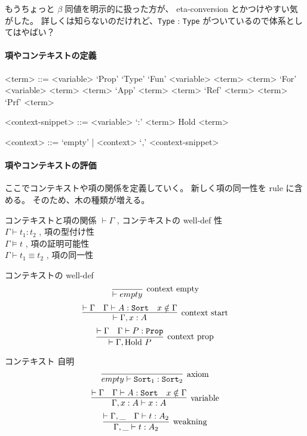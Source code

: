 もうちょっと \(\beta\) 同値を明示的に扱った方が、 eta-conversion とかつけやすい気がした。
詳しくは知らないのだけれど、\texttt{Type} : \texttt{Type} がついているので体系としてはやばい？

\paragraph*{項やコンテキストの定義}
\begin{grammar}
<term> ::= <variable> 
\alt `Prop'
\alt `Type'
\alt `Fun' <variable> <term> <term>
\alt `For' <variable> <term> <term>
\alt `App' <term> <term>
\alt `Ref' <term> <term>
\alt `Prf' <term>

<context-snippet> ::= <variable> `:' <term>
\alt Hold <term>

<context> ::= `empty' | <context> `,' <context-snippet>
\end{grammar}

\paragraph*{項やコンテキストの評価}
ここでコンテキストや項の関係を定義していく。
新しく項の同一性を rule に含める。
そのため、木の種類が増える。

\begin{itembox}[l]{コンテキストと項の関係}
  \(\vdash \Gamma\) , コンテキストの well-def 性 \\
  \(\Gamma \vdash t_1 : t_2\) , 項の型付け性 \\
  \(\Gamma \vDash t\) , 項の証明可能性 \\
  \(\Gamma \vdash t_1 \equiv t_2\) , 項の同一性
\end{itembox}

\begin{itembox}[l]{コンテキストの well-def}
  \[\infer[\text{context empty}]{\vdash empty}{}\]
  \[\infer[\text{context start}]{\vdash \Gamma , x : A}{\vdash \Gamma & \Gamma \vdash A : \texttt{Sort} & x \notin \Gamma}\]
  \[\infer[\text{context prop}]{\vdash \Gamma , \text{Hold } P}{\vdash \Gamma & \Gamma \vdash P : \texttt{Prop}}\]
\end{itembox}

\begin{itembox}[l]{コンテキスト 自明}
  \[\infer[\text{axiom}]{empty \vdash \texttt{Sort}_1 : \texttt{Sort}_2}{}\]
  \[\infer[\text{variable}]{\Gamma , x : A \vdash x : A}{\vdash \Gamma & \Gamma \vdash A : \texttt{Sort} & x \notin \Gamma}\]
  \[\infer[\text{weakning}]{\Gamma , \_ \vdash t : A_2}{\vdash \Gamma , \_ & \Gamma \vdash t : A_2} \]
\end{itembox}

